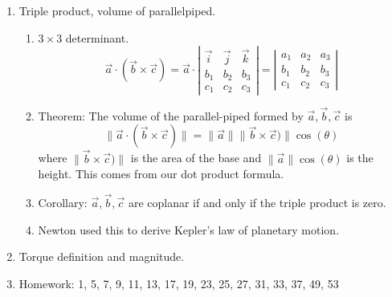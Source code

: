 \documentclass{article}
\begin{document}
\begin{enumerate}
\item Triple product, volume of parallelpiped.
\begin{enumerate}
\item $3 \times 3$ determinant.
\[
\vec{a} \cdot (\vec{b} \times \vec{c}) = \vec{a} \cdot \left|
\begin{array}{ccc}
\vec{i} & \vec{j} & \vec{k} \\
b_1 & b_2 & b_3 \\
c_1 & c_2 & c_3 
\end{array}
\right|
= \left| \begin{array}{ccc}
a_1 & a_2 & a_3 \\
b_1 & b_2 & b_3 \\
c_1 & c_2 & c_3 
\end{array}
\right|
\]
\item Theorem: The volume of the parallel-piped formed by $\vec{a}, \vec{b}, \vec{c}$ is
\[
\| \vec{a} \cdot (\vec{b} \times \vec{c}) \|
= \| \vec{a} \| \| \vec{b} \times \vec{c}) \| \cos(\theta)
\]
where $ \| \vec{b} \times \vec{c}) \|$ is the area of the base and $\| \vec{a} \| \cos(\theta)$ is the height. This comes from our dot product formula.
\item Corollary: $\vec{a}, \vec{b}, \vec{c}$ are coplanar if and only if the triple product is zero.
\item Newton used this to derive Kepler's law of planetary motion. 
\end{enumerate}

\item Torque definition and magnitude.

\item Homework: 1, 5, 7, 9, 11, 13, 17, 19, 23, 25, 27, 31, 33, 37, 49, 53
\end{enumerate}
\end{document}
